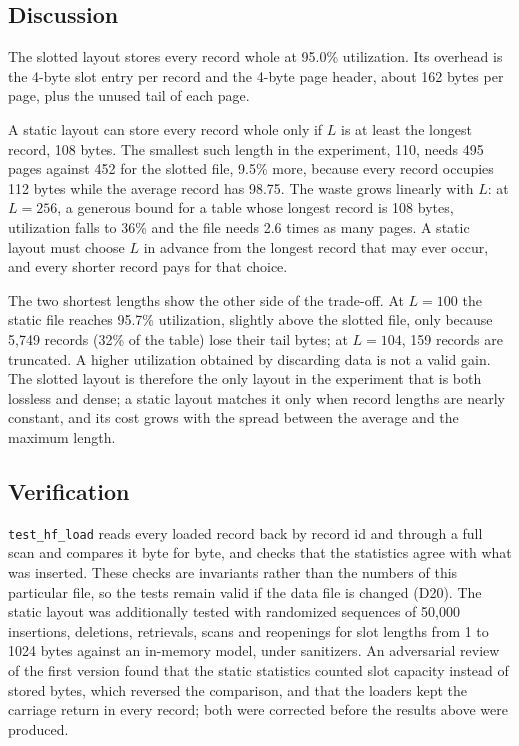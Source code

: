 \documentclass[11pt,a4paper]{article}
\begin{document}
\subsection{Discussion}

The slotted layout stores every record whole at 95.0\% utilization. Its overhead is the 4-byte slot entry per record and the 4-byte page header, about 162 bytes per page, plus the unused tail of each page.

A static layout can store every record whole only if \(L\) is at least the longest record, 108 bytes. The smallest such length in the experiment, 110, needs 495 pages against 452 for the slotted file, 9.5\% more, because every record occupies 112 bytes while the average record has 98.75. The waste grows linearly with \(L\): at \(L = 256\), a generous bound for a table whose longest record is 108 bytes, utilization falls to 36\% and the file needs 2.6 times as many pages. A static layout must choose \(L\) in advance from the longest record that may ever occur, and every shorter record pays for that choice.

The two shortest lengths show the other side of the trade-off. At \(L = 100\) the static file reaches 95.7\% utilization, slightly above the slotted file, only because 5{,}749 records (32\% of the table) lose their tail bytes; at \(L = 104\), 159 records are truncated. A higher utilization obtained by discarding data is not a valid gain. The slotted layout is therefore the only layout in the experiment that is both lossless and dense; a static layout matches it only when record lengths are nearly constant, and its cost grows with the spread between the average and the maximum length.

\subsection{Verification}

\texttt{test\_hf\_load} reads every loaded record back by record id and through a full scan and compares it byte for byte, and checks that the statistics agree with what was inserted. These checks are invariants rather than the numbers of this particular file, so the tests remain valid if the data file is changed (D20). The static layout was additionally tested with randomized sequences of 50{,}000 insertions, deletions, retrievals, scans and reopenings for slot lengths from 1 to 1024 bytes against an in-memory model, under sanitizers. An adversarial review of the first version found that the static statistics counted slot capacity instead of stored bytes, which reversed the comparison, and that the loaders kept the carriage return in every record; both were corrected before the results above were produced.
\end{document}
